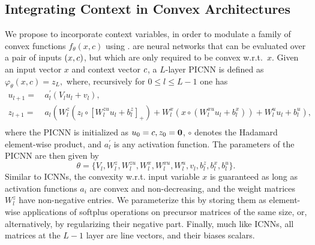 \subsection{Integrating Context in Convex Architectures}
We propose to incorporate context variables, in order to modulate a family of convex functions $f_{\theta}(x, c)$
using .  are neural networks that can be evaluated over a pair of inputs $(x,c)$, but which are only required to be convex w.r.t.~$x$. Given an input vector $x$ and context vector $c$, a ${L}$-layer PICNN is defined as $\varphi_\theta(x, c) = z_{L},$ where, recursively for $0 \leq {l} \leq {L}-1$ one has
\begin{equation} \label{eq:picnn}
\begin{aligned} 
u_{{l}+1} =&\, a^\prime_{l}\left(V_{l} u_{l}+v_{l}\right), \\
z_{{l}+1} =&\, a_{l}\left(W_{l}^{z}\left(z_{l} \circ\left[W_{l}^{z u} u_{l}+b_{l}^{z}\right]_+\right)+\right.
\left.W_{l}^{x}\left(x \circ(W_{l}^{x u} u_{l}+b_{l}^{x})\right)+W_{l}^{u} u_{l}+b_{l}^u\right), \\
\end{aligned}
\end{equation}
where the PICNN is initialized as $u_{0}=c, z_0 = \mathbf{0}$, $\circ$ denotes the Hadamard element-wise product, and $a^\prime_{l}$ is any activation function. The parameters of the PICNN are then given by
$$\theta = \{ V_{l}, W_{l}^{z}, W_{l}^{z u}, W_{l}^{x}, W_{l}^{x u} , W_{l}^{u}, v_{l}, b_{l}^{z}, b_{l}^{x}, b_{l}^u \}.$$ 
Similar to ICNNs, the convexity w.r.t. input variable $x$ is guaranteed as long as activation functions $a_i$ are convex and non-decreasing, and the weight matrices $W_{l}^{z}$ have non-negative entries. We parameterize this by storing them as element-wise applications of softplus operations on precursor matrices of the same size, or, alternatively, by regularizing their negative part. Finally, much like ICNNs, all matrices at the ${L}-1$ layer are line vectors, and their biases scalars.

